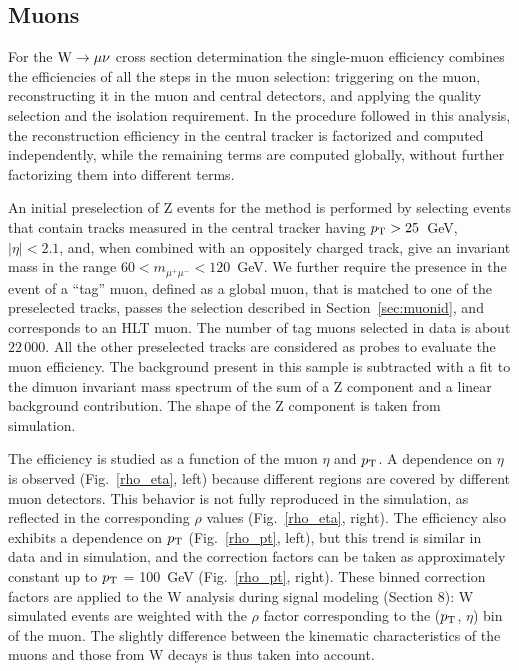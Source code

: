 \subsection{Muons}
\label{sec:muonEff}

For the $\mathrm{W} \rightarrow \mu\nu$ cross section determination
the single-muon efficiency combines the efficiencies of all the steps in the muon selection: 
triggering on the muon, reconstructing it in the muon and central detectors, and applying the
quality selection and the isolation requirement. 
In the procedure followed in this analysis, the reconstruction efficiency in the central tracker is factorized 
and  computed independently, while the remaining terms are computed globally, without further 
factorizing them into different terms.

An initial preselection of Z events for the \TNP method is performed by selecting 
events that contain tracks measured in the central tracker having $p_{\mathrm{T}}>25$~GeV, $|\eta|<2.1$, 
and, when combined with an oppositely charged track, give an 
invariant mass in the range $60<m_{\mu^+\mu^-}<120$~GeV. We 
further require the presence in the event of a ``tag'' muon, defined as a global muon, that is matched to one of
the preselected tracks, passes the selection described in Section~\ref{sec:muonid}, and corresponds
to an HLT muon. The number of tag muons selected in data is about $22\, 000$. All the other preselected 
tracks are considered as probes to evaluate the muon efficiency.
The background present in this sample is subtracted with a fit to the dimuon invariant mass spectrum of the 
sum of a Z component and a linear background contribution. 
The shape of the Z component is taken from simulation.

The efficiency is studied as a function of the muon $\eta$ and $p_{\mathrm{T}}$.
A dependence on $\eta$ is observed (Fig.~\ref{rho_eta}, left) because different 
regions are covered by different muon detectors. 
This behavior is not fully reproduced in 
the simulation, as reflected in the corresponding $\rho$ values (Fig.~\ref{rho_eta}, right). 
The efficiency also exhibits a dependence on $p_{\mathrm{T}}$ (Fig.~\ref{rho_pt}, left), but this trend is 
similar in data and in simulation, and the correction factors can be taken as approximately constant up to 
$p_{\mathrm{T}}$ = 100~GeV (Fig.~\ref{rho_pt}, right).
 These binned correction factors are applied to the W analysis during signal modeling (Section 8):
W simulated events are weighted with the $\rho$ factor corresponding to the ($p_{\mathrm{T}}$, $\eta$) bin of the muon. 
The slightly difference between the kinematic characteristics of the muons and those from W decays is thus taken into account.

